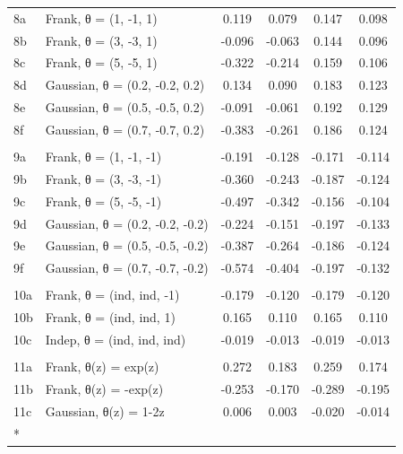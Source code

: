 \documentclass[
]{article}
\begin{document}
\begin{longtable}[t]{llcccc}
\hspace{1em}8a & Frank, θ = (1, -1, 1) & 0.119 & 0.079 & 0.147 & 0.098\\
\hspace{1em}8b & Frank, θ = (3, -3, 1) & -0.096 & -0.063 & 0.144 & 0.096\\
\hspace{1em}8c & Frank, θ = (5, -5, 1) & -0.322 & -0.214 & 0.159 & 0.106\\
\hspace{1em}8d & Gaussian, θ = (0.2, -0.2, 0.2) & 0.134 & 0.090 & 0.183 & 0.123\\
\hspace{1em}8e & Gaussian, θ = (0.5, -0.5, 0.2) & -0.091 & -0.061 & 0.192 & 0.129\\
\hspace{1em}8f & Gaussian, θ = (0.7, -0.7, 0.2) & -0.383 & -0.261 & 0.186 & 0.124\\
\addlinespace[0.3em]
\multicolumn{6}{l}{\textbf{Scenario 9: (+, -, -)}}\\
\hspace{1em}9a & Frank, θ = (1, -1, -1) & -0.191 & -0.128 & -0.171 & -0.114\\
\hspace{1em}9b & Frank, θ = (3, -3, -1) & -0.360 & -0.243 & -0.187 & -0.124\\
\hspace{1em}9c & Frank, θ = (5, -5, -1) & -0.497 & -0.342 & -0.156 & -0.104\\
\hspace{1em}9d & Gaussian, θ = (0.2, -0.2, -0.2) & -0.224 & -0.151 & -0.197 & -0.133\\
\hspace{1em}9e & Gaussian, θ = (0.5, -0.5, -0.2) & -0.387 & -0.264 & -0.186 & -0.124\\
\hspace{1em}9f & Gaussian, θ = (0.7, -0.7, -0.2) & -0.574 & -0.404 & -0.197 & -0.132\\
\addlinespace[0.3em]
\multicolumn{6}{l}{\textbf{Scenario 10: (ind, ind, $\cdot$)}}\\
\hspace{1em}10a & Frank, θ = (ind, ind, -1) & -0.179 & -0.120 & -0.179 & -0.120\\
\hspace{1em}10b & Frank, θ = (ind, ind, 1) & 0.165 & 0.110 & 0.165 & 0.110\\
\hspace{1em}10c & Indep, θ = (ind, ind, ind) & -0.019 & -0.013 & -0.019 & -0.013\\
\addlinespace[0.3em]
\multicolumn{6}{l}{\textbf{Scenario 11: Simplifying assumption violated}}\\
\hspace{1em}11a & Frank, θ(z) = exp(z) & 0.272 & 0.183 & 0.259 & 0.174\\
\hspace{1em}11b & Frank, θ(z) = -exp(z) & -0.253 & -0.170 & -0.289 & -0.195\\
\hspace{1em}11c & Gaussian, θ(z) = 1-2z & 0.006 & 0.003 & -0.020 & -0.014\\*
\end{longtable}
\endgroup{}
\end{document}
